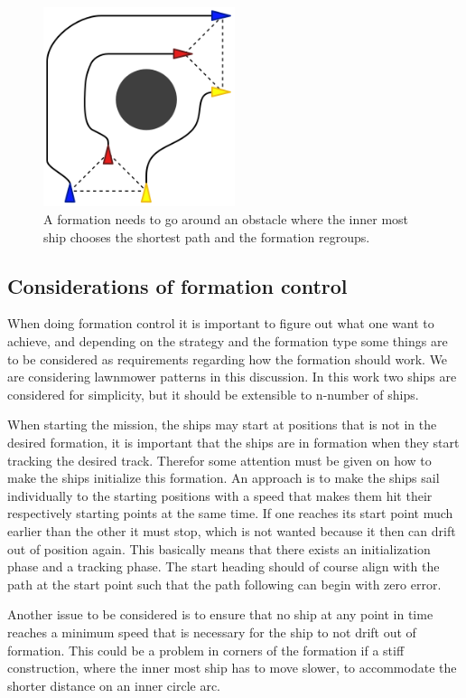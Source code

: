 \begin{figure}[htbp]
	\centering
	\includegraphics[width=0.5\textwidth]{fig/form_avoid}
	\caption{A formation needs to go around an obstacle where the inner most ship chooses the shortest path and the formation regroups.}
	\label{fig:avoid}
\end{figure}

\subsection{Considerations of formation control}
When doing formation control it is important to figure out what one
want to achieve, and depending on the strategy and the formation type
some things are to be considered as requirements regarding how the
formation should work. We are considering lawnmower patterns in this
discussion. In this work two ships are considered for simplicity, but
it should be extensible to n-number of ships.

When starting the mission, the ships may start at positions that
is not in the desired formation, it is important that the ships are in
formation when they start tracking the desired track. Therefor some
attention must be given on how to make the ships initialize this
formation. An approach is to make the ships sail individually to the
starting positions with a speed that makes them hit their respectively starting points at
the same time. If one reaches its start point much earlier
than the other it must stop, which is not wanted because it then can
drift out of position again. This basically means that there exists an initialization
phase and a tracking phase. The start heading should of
course align with the path at the start point such that the path following can begin with zero error.

Another issue to be considered is to ensure that no ship at
any point in time reaches a minimum speed that is necessary for the
ship to not drift out of formation. This could be a problem in corners
of the formation if a stiff construction, where the inner most ship
has to move slower, to accommodate the shorter distance on an inner
circle arc.

